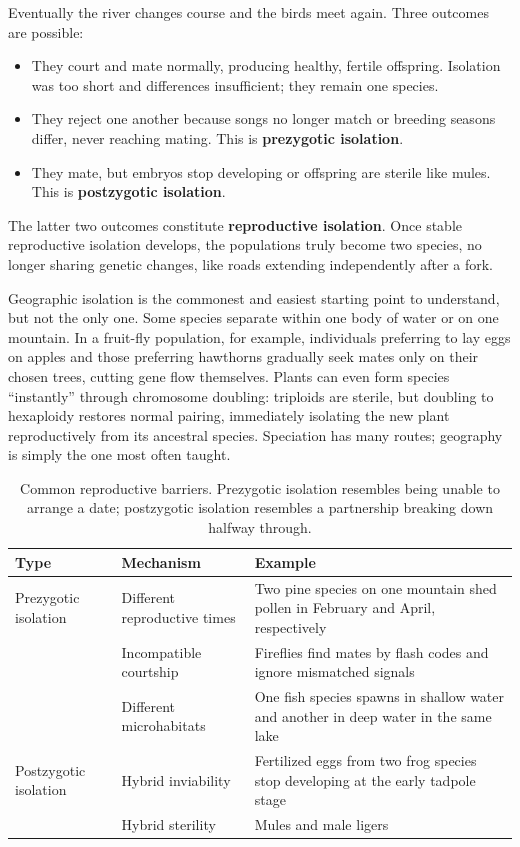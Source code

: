 Eventually the river changes course and the birds meet again. Three outcomes are possible:

\begin{itemize}[itemsep=2pt]
\item They court and mate normally, producing healthy, fertile offspring. Isolation was too short and differences insufficient; they remain one species.
\item They reject one another because songs no longer match or breeding seasons differ, never reaching mating. This is \textbf{prezygotic isolation}.
\item They mate, but embryos stop developing or offspring are sterile like mules. This is \textbf{postzygotic isolation}.
\end{itemize}

The latter two outcomes constitute \textbf{reproductive isolation}. Once stable reproductive isolation develops, the populations truly become two species, no longer sharing genetic changes, like roads extending independently after a fork.

Geographic isolation is the commonest and easiest starting point to understand, but not the only one. Some species separate within one body of water or on one mountain. In a fruit-fly population, for example, individuals preferring to lay eggs on apples and those preferring hawthorns gradually seek mates only on their chosen trees, cutting gene flow themselves. Plants can even form species ``instantly'' through chromosome doubling: triploids are sterile, but doubling to hexaploidy restores normal pairing, immediately isolating the new plant reproductively from its ancestral species. Speciation has many routes; geography is simply the one most often taught.

\begin{table}[htbp]
\centering
\begin{tabular}{p{2.6cm}p{3.4cm}p{6.2cm}}
\toprule
Type & Mechanism & Example \\
\midrule
Prezygotic isolation & Different reproductive times & Two pine species on one mountain shed pollen in February and April, respectively \\
 & Incompatible courtship & Fireflies find mates by flash codes and ignore mismatched signals \\
 & Different microhabitats & One fish species spawns in shallow water and another in deep water in the same lake \\
Postzygotic isolation & Hybrid inviability & Fertilized eggs from two frog species stop developing at the early tadpole stage \\
 & Hybrid sterility & Mules and male ligers \\
\bottomrule
\end{tabular}
\caption{Common reproductive barriers. Prezygotic isolation resembles being unable to arrange a date; postzygotic isolation resembles a partnership breaking down halfway through.}
\end{table}

